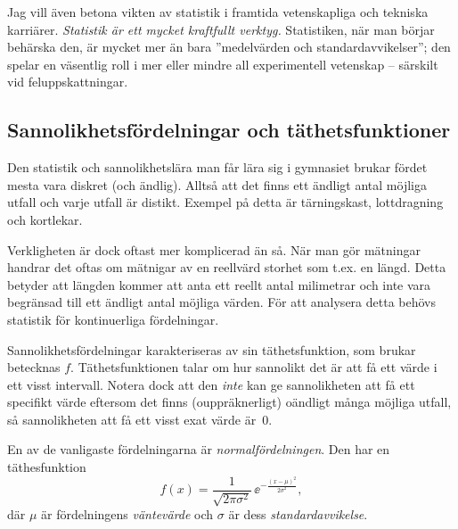 \documentclass[11pt,a4paper, english, swedish
]{article}
\begin{document}
Jag vill även betona vikten av statistik i framtida vetenskapliga och
tekniska karriärer. \emph{Statistik är ett mycket kraftfullt verktyg.}
Statistiken, när man börjar behärska den, är mycket mer än bara
''medelvärden och standardavvikelser''; den spelar en väsentlig roll i
mer eller mindre all experimentell vetenskap -- särskilt vid
feluppskattningar. 

\subsection{Sannolikhetsfördelningar och täthetsfunktioner}
Den statistik och sannolikhetslära man får lära sig i gymnasiet brukar
fördet mesta vara diskret (och ändlig). Alltså att det finns ett
ändligt antal möjliga utfall och varje utfall är distikt. Exempel på
detta är tärningskast, lottdragning och kortlekar. 

Verkligheten är dock oftast mer komplicerad än så. När man gör
mätningar handrar det oftas om mätnigar av en reellvärd
storhet som t.ex. en längd\footnotemark{}. Detta betyder att längden
kommer att anta ett reellt antal milimetrar och inte vara begränsad
till ett ändligt antal möjliga värden. För att analysera detta behövs
statistik för kontinuerliga fördelningar. 

Sannolikhetsfördelningar karakteriseras av sin täthetsfunktion, som
brukar betecknas $f$. Täthetsfunktionen talar om hur sannolikt det är
att få ett värde i ett visst intervall. Notera dock att den
\emph{inte} kan ge sannolikheten att få ett specifikt värde eftersom
det finns (ouppräknerligt) oändligt många möjliga utfall, så
sannolikheten att få ett visst exat värde är~0.



En av de vanligaste fördelningarna är \emph{normalfördelningen}. Den
har en täthesfunktion
\begin{equation}
f(x) = \frac{1}{\sqrt{2\pi\sigma^2}} \, \ee^{-\frac{(x-\mu)^2}{2\sigma^2}},
\end{equation}
där $\mu$ är fördelningens \emph{väntevärde} och $\sigma$ är dess
\emph{standardavvikelse}. 
\end{document}
